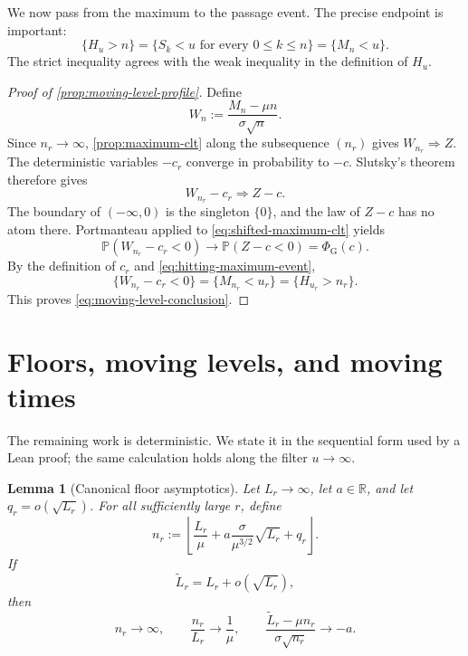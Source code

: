 \documentclass[10pt,reqno,a4paper]{amsart}
\numberwithin{equation}{section}
\theoremstyle{plain}
\newtheorem{lemma}[theorem]{Lemma}
\theoremstyle{definition}
\theoremstyle{remark}
\newcommand{\R}{\mathbb{R}}
\newcommand{\Pp}{\mathbb{P}}
\newcommand{\1}{\mathbf{1}}
\newcommand{\ind}{\Rightarrow}
\begin{document}
We now pass from the maximum to the passage event.  The precise endpoint is
important:
\begin{equation}\label{eq:hitting-maximum-event}
  \{H_u>n\}
  =
  \{S_k<u\text{ for every }0\leq k\leq n\}
  =
  \{M_n<u\}.
\end{equation}
The strict inequality agrees with the weak inequality in the definition of
$H_u$.

\begin{proof}[Proof of \cref{prop:moving-level-profile}]
  Define
  \begin{equation*}
    W_n:=\frac{M_n-\mu n}{\sigma\sqrt n}.
  \end{equation*}
  Since $n_r\to\infty$, \cref{prop:maximum-clt} along the subsequence
  $(n_r)$ gives $W_{n_r}\ind Z$.  The deterministic variables $-c_r$
  converge in probability to $-c$.  Slutsky's theorem therefore gives
  \begin{equation}\label{eq:shifted-maximum-clt}
    W_{n_r}-c_r\ind Z-c.
  \end{equation}
  The boundary of $(-\infty,0)$ is the singleton $\{0\}$, and the law of
  $Z-c$ has no atom there.  Portmanteau applied to
  \cref{eq:shifted-maximum-clt} yields
  \begin{equation*}
    \Pp(W_{n_r}-c_r<0)
    \longrightarrow
    \Pp(Z-c<0)
    =\Phi_{\mathrm G}(c).
  \end{equation*}
  By the definition of $c_r$ and \cref{eq:hitting-maximum-event},
  \begin{equation*}
    \{W_{n_r}-c_r<0\}
    =\{M_{n_r}<u_r\}
    =\{H_{u_r}>n_r\}.
  \end{equation*}
  This proves \cref{eq:moving-level-conclusion}.
\end{proof}

\section{Floors, moving levels, and moving times}
\label{sec:moving-parameters}

The remaining work is deterministic.  We state it in the sequential form
used by a Lean proof; the same calculation holds along the filter $u\to
\infty$.

\begin{lemma}[Canonical floor asymptotics]
\label{lem:canonical-floor}
  Let $L_r\to\infty$, let $a\in\R$, and let $q_r=o(\sqrt{L_r})$.  For all
  sufficiently large $r$, define
  \begin{equation}\label{eq:perturbed-time}
    n_r
    :=
    \left\lfloor
      \frac{L_r}{\mu}
      +a\frac{\sigma}{\mu^{3/2}}\sqrt{L_r}
      +q_r
    \right\rfloor.
  \end{equation}
  If
  \begin{equation}\label{eq:perturbed-level}
    \widetilde L_r=L_r+o(\sqrt{L_r}),
  \end{equation}
  then
  \begin{equation}\label{eq:floor-asymptotics}
    n_r\longrightarrow\infty,
    \qquad
    \frac{n_r}{L_r}\longrightarrow\frac1\mu,
    \qquad
    \frac{\widetilde L_r-\mu n_r}{\sigma\sqrt{n_r}}
    \longrightarrow-a.
  \end{equation}
\end{lemma}
\end{document}
